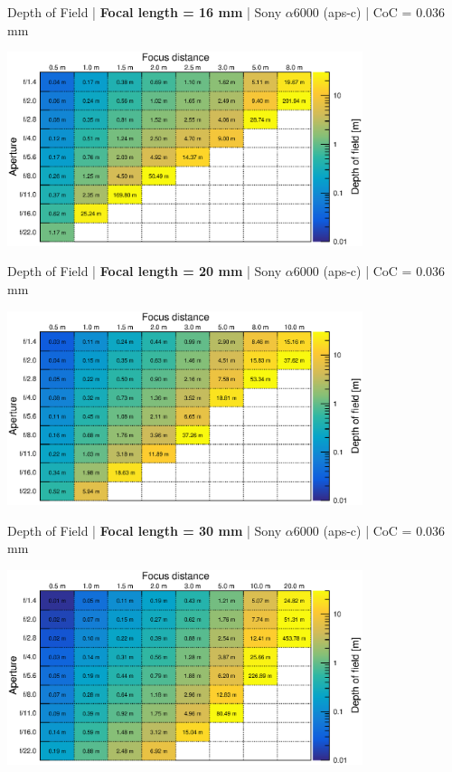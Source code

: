 \documentclass[aspectratio=169]{beamer}
\begin{document}
\begin{frame}[plain]{}
  \vspace{1ex}
  \centering
  Depth of Field | {\bf Focal length = 16 mm} |  Sony $\alpha$\hspace{0.1em}6000 (aps-c) | CoC = 0.036 mm
  
  \includegraphics[center,width=0.78\textwidth]{img/depth-of-field_focl16.eps}
\end{frame}

\begin{frame}[plain]{}
  \vspace{1ex}
  \centering
  Depth of Field | {\bf Focal length = 20 mm} |  Sony $\alpha$\hspace{0.1em}6000 (aps-c) | CoC = 0.036 mm
  
  \includegraphics[center,width=0.78\textwidth]{img/depth-of-field_focl20.eps}
\end{frame}

\begin{frame}[plain]{}
  \vspace{1ex}
  \centering
  Depth of Field | {\bf Focal length = 30 mm} |  Sony $\alpha$\hspace{0.1em}6000 (aps-c) | CoC = 0.036 mm
  
  \includegraphics[center,width=0.78\textwidth]{img/depth-of-field_focl30.eps}
\end{frame}
\end{document}
